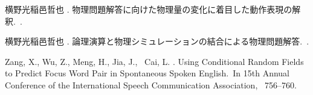 \documentclass[japanese]{jnlp_1.4b}
\begin{document}
\begin{thebibliography}{}
横野光\JBA 稲邑哲也 \BBCP.
\newblock 物理問題解答に向けた物理量の変化に着目した動作表現の解釈.\
\newblock {}.

横野光\JBA 稲邑哲也 \BBCP.
\newblock 論理演算と物理シミュレーションの結合による物理問題解答.\
\newblock {}.

Zang, X., Wu, Z., Meng, H., Jia, J., \BBA\ Cai, L. \BBCP.
\newblock \BBOQ Using Conditional Random Fields to Predict Focus Word Pair in
  Spontaneous Spoken English.\BBCQ\
\newblock In {\Bem 15th Annual Conference of the International Speech
  Communication Association}, \mbox{\BPGS\ 756--760}.

\end{thebibliography}
\end{document}
